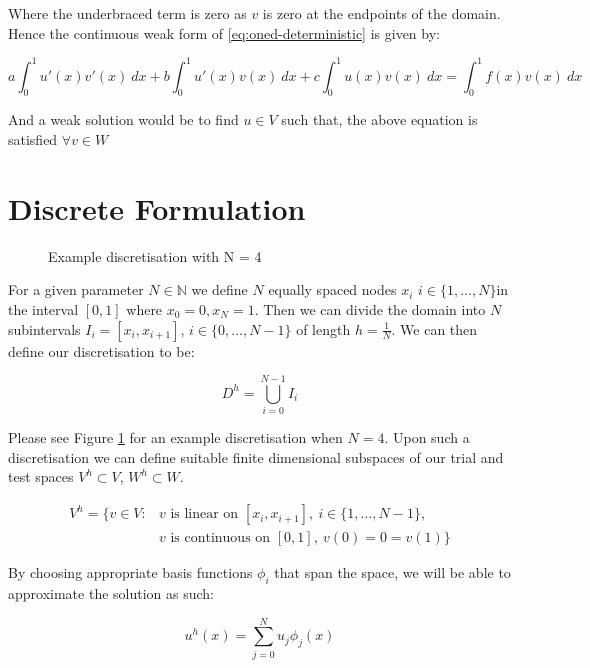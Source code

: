 Where the underbraced term is zero as $v$ is zero at the endpoints of the
domain. Hence the continuous weak form of \ref{eq:oned-deterministic} is given
by:

\begin{equation}\label{eq:wk-oned-deterministic}
    a\int_0^1{u'(x)v'(x)\ dx} + b\int_0^1{u'(x)v(x)\ dx}
    + c\int_0^1{u(x)v(x)\ dx} = \int_0^1{f(x)v(x)\ dx}
\end{equation}

And a weak solution would be to find $u \in V$ such that, the above equation is
satisfied $\forall v \in W$

\section{Discrete Formulation}

\begin{figure}
\centering

\caption{Example discretisation with N = 4}
\label{fig:one-d-discretisation}
\end{figure}

For a given parameter $N \in \mathbb{N}$ we define $N$ equally spaced nodes
$x_i$ $i \in \{1, \ldots, N\} $in the interval $[0,1]$ where
$x_0 = 0, x_N = 1$. Then we can divide the domain into $N$ subintervals
$ I_i = [x_i, x_{i+1}]$, $i \in \{0,\ldots,N - 1\}$ of length $h = \frac{1}{N}$.
We can then define our discretisation to be:

\[
    D^h = \bigcup_{i=0}^{N - 1} I_i
\]

Please see Figure \ref{fig:one-d-discretisation} for an example discretisation
when $N=4$.  Upon such a discretisation we can define suitable finite
dimensional subspaces of our trial and test spaces $V^h \subset V$, $W^h
\subset W$.

\begin{align*}
    V^h = \{v \in V: &v \text{ is linear on } [x_i, x_{i+1}],
          \ i \in \{1, \ldots, N - 1\}, \\
          &v \text{ is continuous on } [0, 1],\ v(0) = 0 = v(1)\}
\end{align*}

By choosing appropriate basis functions $\phi_i$ that span the space, we will
be able to approximate the solution as such:

\begin{equation}\label{eq:one-d-approx-soln}
    u^h(x) = \sum_{j = 0}^N{u_j\phi_j(x)}
\end{equation}

